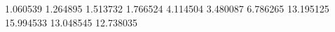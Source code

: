 1.060539
1.264895
1.513732
1.766524
4.114504
3.480087
6.786265
13.195125
15.994533
13.048545
12.738035
